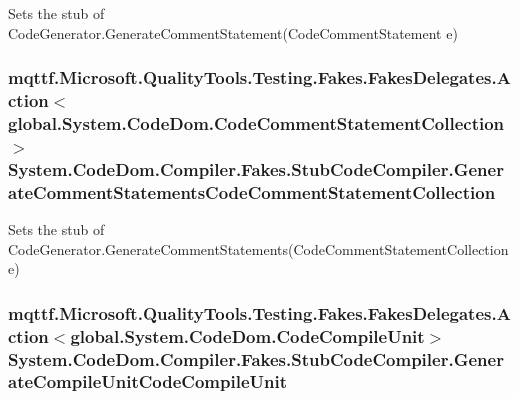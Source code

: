 Sets the stub of Code\-Generator.\-Generate\-Comment\-Statement(\-Code\-Comment\-Statement e)

\hypertarget{class_system_1_1_code_dom_1_1_compiler_1_1_fakes_1_1_stub_code_compiler_a59fd534b4deda1be10f403f8410f2132}{
\subsubsection[{Generate\-Comment\-Statements\-Code\-Comment\-Statement\-Collection}]{\setlength{\rightskip}{0pt plus 5cm}mqttf.\-Microsoft.\-Quality\-Tools.\-Testing.\-Fakes.\-Fakes\-Delegates.\-Action$<$global.\-System.\-Code\-Dom.\-Code\-Comment\-Statement\-Collection$>$ System.\-Code\-Dom.\-Compiler.\-Fakes.\-Stub\-Code\-Compiler.\-Generate\-Comment\-Statements\-Code\-Comment\-Statement\-Collection}}\label{class_system_1_1_code_dom_1_1_compiler_1_1_fakes_1_1_stub_code_compiler_a59fd534b4deda1be10f403f8410f2132}


Sets the stub of Code\-Generator.\-Generate\-Comment\-Statements(\-Code\-Comment\-Statement\-Collection e)

\hypertarget{class_system_1_1_code_dom_1_1_compiler_1_1_fakes_1_1_stub_code_compiler_a169d85e1a16a122e2a4a72c17008fc5c}{
\subsubsection[{Generate\-Compile\-Unit\-Code\-Compile\-Unit}]{\setlength{\rightskip}{0pt plus 5cm}mqttf.\-Microsoft.\-Quality\-Tools.\-Testing.\-Fakes.\-Fakes\-Delegates.\-Action$<$global.\-System.\-Code\-Dom.\-Code\-Compile\-Unit$>$ System.\-Code\-Dom.\-Compiler.\-Fakes.\-Stub\-Code\-Compiler.\-Generate\-Compile\-Unit\-Code\-Compile\-Unit}}\label{class_system_1_1_code_dom_1_1_compiler_1_1_fakes_1_1_stub_code_compiler_a169d85e1a16a122e2a4a72c17008fc5c}


